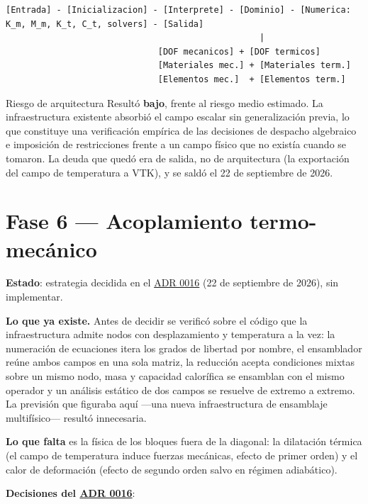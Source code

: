 \documentclass[11pt,oneside]{report}
\begin{document}
\begin{lstlisting}
[Entrada] - [Inicializacion] - [Interprete] - [Dominio] - [Numerica: K_m, M_m, K_t, C_t, solvers] - [Salida]
                                                  |
                              [DOF mecanicos] + [DOF termicos]
                              [Materiales mec.] + [Materiales term.]
                              [Elementos mec.]  + [Elementos term.]

\end{lstlisting}

\begin{infobox}{Riesgo de arquitectura}
Resultó \textbf{bajo}, frente al riesgo medio estimado. La infraestructura existente absorbió el campo escalar sin generalización previa, lo que constituye una verificación empírica de las decisiones de despacho algebraico e imposición de restricciones frente a un campo físico que no existía cuando se tomaron. La deuda que quedó era de salida, no de arquitectura (la exportación del campo de temperatura a VTK), y se saldó el 22 de septiembre de 2026.
\end{infobox}

\section{Fase 6 --- Acoplamiento termo-mecánico}

\textbf{Estado}: estrategia decidida en el \hyperref[adr:0016]{ADR 0016} (22 de septiembre de 2026), sin implementar.

\textbf{Lo que ya existe.} Antes de decidir se verificó sobre el código que la infraestructura admite nodos con desplazamiento y temperatura a la vez: la numeración de ecuaciones itera los grados de libertad por nombre, el ensamblador reúne ambos campos en una sola matriz, la reducción acepta condiciones mixtas sobre un mismo nodo, masa y capacidad calorífica se ensamblan con el mismo operador y un análisis estático de dos campos se resuelve de extremo a extremo. La previsión que figuraba aquí ---una nueva infraestructura de ensamblaje multifísico--- resultó innecesaria.

\textbf{Lo que falta} es la física de los bloques fuera de la diagonal: la dilatación térmica (el campo de temperatura induce fuerzas mecánicas, efecto de primer orden) y el calor de deformación (efecto de segundo orden salvo en régimen adiabático).

\textbf{Decisiones del \hyperref[adr:0016]{ADR 0016}}:
\end{document}
